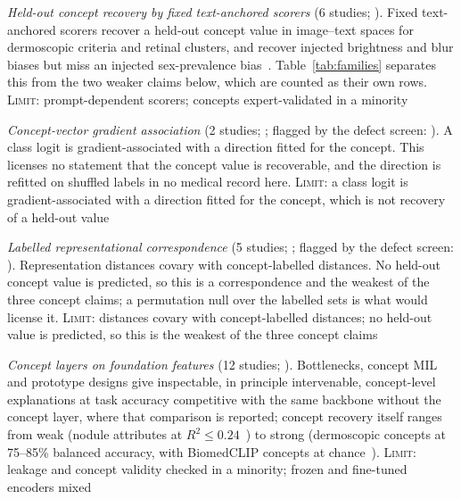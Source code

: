 \begin{description}[leftmargin=1.35em,labelsep=0.4em,itemsep=2pt,topsep=2pt,parsep=0pt]
\item[\textbf{F1b}] \emph{Held-out concept recovery by fixed text-anchored scorers} (6 studies; \cite{bertolini2025strengths,kim2024transparent,luo2025xbench,mensah2026interpretable,nie2025explainable,patricio2023conceptbased}). Fixed text-anchored scorers recover a held-out concept value in image--text spaces for dermoscopic criteria and retinal clusters, and recover injected brightness and blur biases but miss an injected sex-prevalence bias~\cite{bertolini2025strengths}. Table~\ref{tab:families} separates this from the two weaker claims below, which are counted as their own rows. \textsc{Limit:} prompt-dependent scorers; concepts expert-validated in a minority
\item[\textbf{F1b$'$}] \emph{Concept-vector gradient association} (2 studies; \cite{hieromnimon2025analysis,nicolson2024textcavs}; flagged by the defect screen: \cite{hieromnimon2025analysis}). A class logit is gradient-associated with a direction fitted for the concept. This licenses no statement that the concept value is recoverable, and the direction is refitted on shuffled labels in no medical record here. \textsc{Limit:} a class logit is gradient-associated with a direction fitted for the concept, which is not recovery of a held-out value
\item[\textbf{F1b$^{\prime\prime}$}] \emph{Labelled representational correspondence} (5 studies; \cite{arasteh2026candor,bakhta2026frozen,mishra2025comparing,vig2026do,zhao2026benchmarking}; flagged by the defect screen: \cite{bakhta2026frozen,zhao2026benchmarking}). Representation distances covary with concept-labelled distances. No held-out concept value is predicted, so this is a correspondence and the weakest of the three concept claims; a permutation null over the labelled sets is what would license it. \textsc{Limit:} distances covary with concept-labelled distances; no held-out value is predicted, so this is the weakest of the three concept claims
\item[\textbf{F1c}] \emph{Concept layers on foundation features} (12 studies; \cite{gao2024aligning,gao2025evaluating,han2026clear,patricio2025twostep,pellegrini2023xplainer,rojas2026echopcbm,sun2025label,tushar2026distilling,wang2025mvp,yan2023robust,yang2024textbook,zhang2026regionfm}). Bottlenecks, concept MIL and prototype designs give inspectable, in principle intervenable, concept-level explanations at task accuracy competitive with the same backbone without the concept layer, where that comparison is reported; concept recovery itself ranges from weak (nodule attributes at $R^2 \le 0.24$~\cite{tushar2026distilling}) to strong (dermoscopic concepts at 75--85\% balanced accuracy, with BiomedCLIP concepts at chance~\cite{patricio2025twostep}). \textsc{Limit:} leakage and concept validity checked in a minority; frozen and fine-tuned encoders mixed

\end{description}
